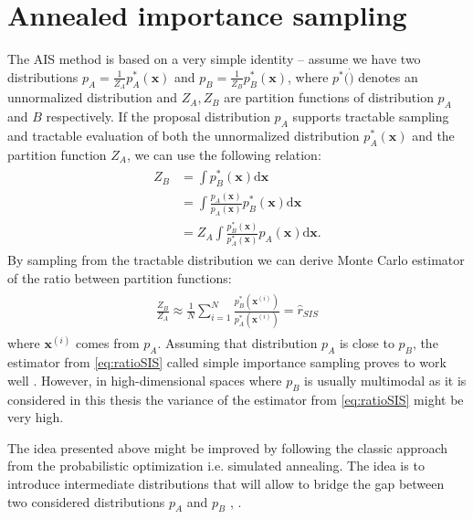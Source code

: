 \section{Annealed importance sampling}
The AIS method is based on a very simple identity -- assume we have two distributions $p_A= \frac{1}{Z_A}p_A^*(\mathbf{x})$ and $p_B= \frac{1}{Z_B}p_B^*(\mathbf{x})$, where $p^*(\dot)$ denotes an unnormalized distribution and $Z_A, Z_B$ are partition functions of distribution $p_A$ and $B$ respectively. If the proposal distribution $p_A$ supports tractable sampling and tractable evaluation of both the unnormalized distribution $p_A^*(\mathbf{x})$ and the partition function $Z_A$, we can use the following relation:
\begin{align}
\begin{split}
Z_B & = \int p^*_B(\mathbf{x}) \text{d} \mathbf{x} \\ 
 &= \int \frac{p_A(\mathbf{x})}{p_A(\mathbf{x})} p^*_B(\mathbf{x}) \text{d} \mathbf{x}\\
 &=  Z_A \int \frac{ p^*_B(\mathbf{x}) }{ p^*_A(\mathbf{x}) }p_A(\mathbf{x})  \text{d} \mathbf{x} .
\end{split}
\end{align}
By sampling from the tractable distribution we can derive Monte Carlo estimator of the ratio between partition functions:
\begin{align}
\begin{split}
\frac{Z_B}{Z_A} \approx \frac{1}{N} \sum_{i=1}^N \frac{ p^*_B(\mathbf{x}^{(i)}) }{ p^*_A(\mathbf{x}^{(i)}) } = \hat{r}_{SIS}
\label{eq:ratioSIS}
\end{split}
\end{align}
where $\mathbf{x}^{(i)}$ comes from $p_A$.
Assuming that distribution $p_A$ is close to $p_B$, the estimator from  \ref{eq:ratioSIS} called simple importance sampling proves to work well \cite{minka2005divergence}. However, in high-dimensional spaces where $p_B$ is usually multimodal as it is considered in this thesis the variance of the estimator from \ref{eq:ratioSIS} might be very high. 

The idea presented above might be improved by following the classic approach from the probabilistic optimization i.e. simulated annealing. The idea is to introduce intermediate distributions that will allow to bridge the gap between two considered distributions $p_A$ and $p_B$ \cite{jarzynski1997nonequilibrium}, \cite{neal2001annealed}.

